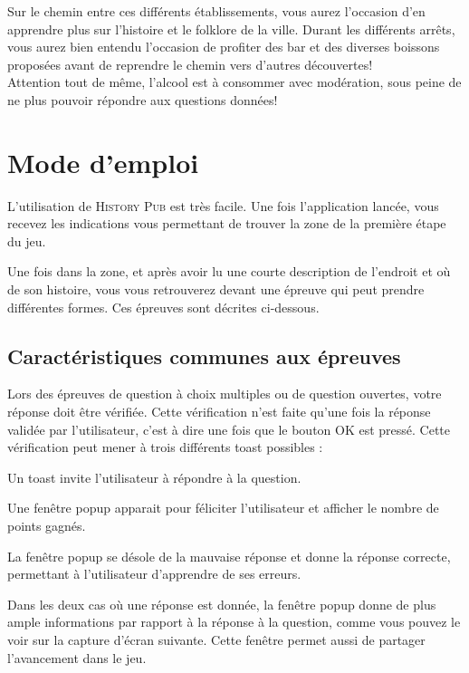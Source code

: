 \documentclass[11pt]{scrreprt}
\begin{document}
    Sur le chemin entre ces différents établissements, vous aurez l'occasion d'en apprendre plus sur l'histoire et le folklore de la ville. Durant les différents arrêts, vous aurez bien entendu l'occasion de profiter des bar et des diverses boissons proposées avant de reprendre le chemin vers d'autres découvertes!\\

    Attention tout de même, l'alcool est à consommer avec modération, sous peine de ne plus pouvoir répondre aux questions données!\\

    \chapter{Mode d'emploi}
    L'utilisation de \textsc{History Pub} est très facile. Une fois l'application lancée, vous recevez les indications vous permettant de trouver la zone de la première étape du jeu.


    Une fois dans la zone, et après avoir lu une courte description de l'endroit et où de son histoire, vous vous retrouverez devant une épreuve qui peut prendre différentes formes. Ces épreuves sont décrites ci-dessous.

    \section{Caractéristiques communes aux épreuves}
    Lors des épreuves de question à choix multiples ou de question ouvertes, votre réponse doit être vérifiée. Cette vérification n'est faite qu'une fois la réponse validée par l'utilisateur, c'est à dire une fois que le bouton OK est pressé. Cette vérification peut mener à trois différents toast possibles :
    \begin{description}[style=nextline]
        \item[Pas de réponse donnée]Un toast invite l'utilisateur à répondre à la question.
        \item[Réponse correcte]Une fenêtre popup apparait pour féliciter l'utilisateur et afficher le nombre de points gagnés.
        \item[Réponse incorrecte]La fenêtre popup se désole de la mauvaise réponse et donne la réponse correcte, permettant à l'utilisateur d'apprendre de ses erreurs.
    \end{description}
    Dans les deux cas où une réponse est donnée, la fenêtre popup donne de plus ample informations par rapport à la réponse à la question, comme vous pouvez le voir sur la capture d'écran suivante. Cette fenêtre permet aussi de partager l'avancement dans le jeu.
\end{document}
